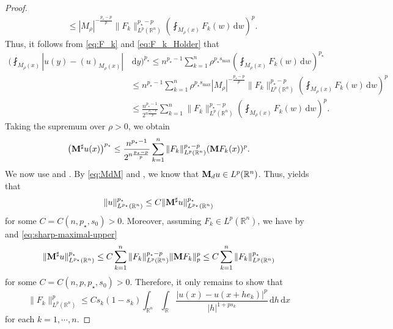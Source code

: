 \documentclass[11pt]{amsart}
\theoremstyle{plain}
\theoremstyle{definition}
\numberwithin{equation}{section}
\begin{document}
\begin{proof}
\begin{equation}
\begin{split}
&\leq |M_{\rho}|^{-\frac{{p_{\star}}-p}{p}} \|F_k\|_{L^p(\mathbb{R}^n)}^{{p_{\star}}-p} \left( \fint_{M_{\rho}(x)} F_k(w) \,\mathrm{d}w \right)^p.
\end{split}
\end{equation}
Thus, it follows from \eqref{eq:F_k} and \eqref{eq:F_k_Holder} that
\begin{equation*}
\begin{split}
\Bigg( \fint_{M_\rho(x)} |u(y) - (u)_{M_\rho(x)}|&\,\mathrm{d}y \Bigg)^{p_{\star}} 
\leq n^{{p_{\star}}-1} \sum_{k=1}^n \rho^{{p_{\star}}s_{\max}} \left( \fint_{M_{\rho}(x)} F_k(w) \,\mathrm{d}w \right)^{p_{\star}} \\
&\leq n^{{p_{\star}}-1} \sum_{k=1}^n \rho^{{p_{\star}}s_{\max}} |M_{\rho}|^{-\frac{{p_{\star}}-p}{p}} \|F_k\|_{L^p(\mathbb{R}^n)}^{{p_{\star}}-p} \left( \fint_{M_{\rho}(x)} F_k(w) \,\mathrm{d}w \right)^p \\
&\leq \frac{n^{{p_{\star}}-1}}{2^{n\frac{{p_{\star}}-p}{p}}} \sum_{k=1}^n \|F_k\|_{L^p(\mathbb{R}^n)}^{{p_{\star}}-p} \left( \fint_{M_{\rho}(x)} F_k(w) \,\mathrm{d}w \right)^p.
\end{split}
\end{equation*}
Taking the supremum over $\rho > 0$, we obtain
\begin{equation} \label{eq:sharp-maximal-upper}
\left( {\bf M}^\sharp u(x) \right)^{p_{\star}} \leq \frac{n^{{p_{\star}}-1}}{2^{n\frac{{p_{\star}}-p}{p}}} \sum_{k=1}^n \|F_k\|_{L^p(\mathbb{R}^n)}^{{p_{\star}}-p} ({\bf M}F_k(x))^p.
\end{equation}
We now use  and . By \eqref{eq:MdM} and , we know that ${\bf M}_d u \in L^p(\mathbb{R}^n)$. Thus,  yields that
\begin{equation*}
\|u\|_{L^{p_{\star}}(\mathbb{R}^n)}^{p_{\star}} \leq C \|{\bf M}^\sharp u\|_{L^{p_{\star}}(\mathbb{R}^n)}^{p_{\star}}
\end{equation*}
for some $C = C(n, p_{\star}, s_0) > 0$. Moreover, assuming $F_k \in L^p(\mathbb{R}^n)$, we have by  and \eqref{eq:sharp-maximal-upper}
\begin{equation*}
\|{\bf M}^\sharp u\|_{L^{p_{\star}}(\mathbb{R}^n)}^{p_{\star}} \leq C \sum_{k=1}^n \|F_k\|_{L^p(\mathbb{R}^n)}^{{p_{\star}}-p} \|{\bf M}F_k\|_p^p \leq C \sum_{k=1}^n \|F_k\|_{L^p(\mathbb{R}^n)}^{p_{\star}}
\end{equation*}
for some $C = C(n, p, p_{\star}, s_0) > 0$. Therefore, it only remains to show that
\begin{equation} \label{eq:claim}
\|F_k\|_{L^p(\mathbb{R}^n)}^p \leq C s_k(1-s_k) \int_{\mathbb{R}^n} \int_{\mathbb{R}} \frac{|u(x)-u(x+he_k)|^p}{|h|^{1+ps_k}} \,\mathrm{d}h \,\mathrm{d}x
\end{equation}
for each $k=1,\cdots, n$.


\end{proof}
\end{document}
